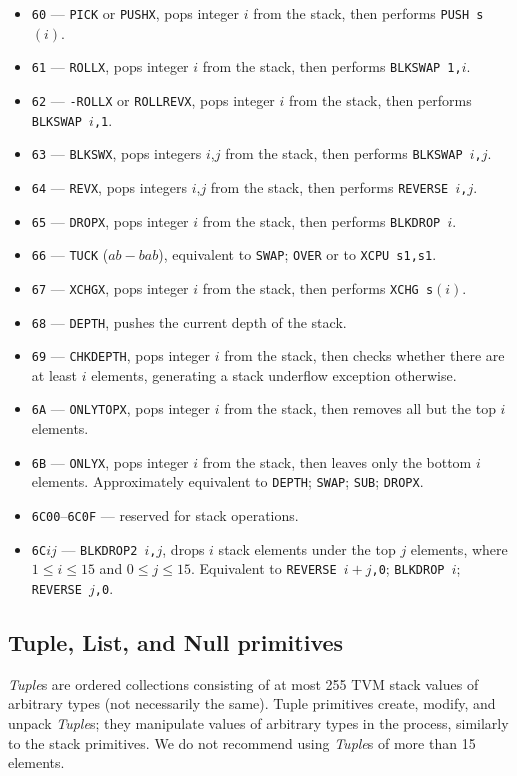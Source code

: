 \documentclass[12pt,oneside]{article}
\def\mysubsection#1{

    \subsection{#1}\fancyhead[C]{\small{\textsc{\textrm{\thesubsection.} #1}}}}
\begin{document}
\begin{itemize}
\item {\tt 60} --- {\tt PICK} or {\tt PUSHX}, pops integer $i$ from the stack, then performs {\tt PUSH s$(i)$}.
\item {\tt 61} --- {\tt ROLLX}, pops integer $i$ from the stack, then performs {\tt BLKSWAP 1,$i$}.
\item {\tt 62} --- {\tt -ROLLX} or {\tt ROLLREVX}, pops integer $i$ from the stack, then performs {\tt BLKSWAP $i$,1}.
\item {\tt 63} --- {\tt BLKSWX}, pops integers $i$,$j$ from the stack, then performs {\tt BLKSWAP $i$,$j$}.
\item {\tt 64} --- {\tt REVX}, pops integers $i$,$j$ from the stack, then performs {\tt REVERSE $i$,$j$}.
\item {\tt 65} --- {\tt DROPX}, pops integer $i$ from the stack, then performs {\tt BLKDROP $i$}.
\item {\tt 66} --- {\tt TUCK} ($a b - b a b$), equivalent to {\tt SWAP}; {\tt OVER} or to {\tt XCPU s1,s1}.
\item {\tt 67} --- {\tt XCHGX}, pops integer $i$ from the stack, then performs {\tt XCHG s$(i)$}.
\item {\tt 68} --- {\tt DEPTH}, pushes the current depth of the stack.
\item {\tt 69} --- {\tt CHKDEPTH}, pops integer $i$ from the stack, then checks whether there are at least $i$ elements, generating a stack underflow exception otherwise.
\item {\tt 6A} --- {\tt ONLYTOPX}, pops integer $i$ from the stack, then removes all but the top $i$ elements.
\item {\tt 6B} --- {\tt ONLYX}, pops integer $i$ from the stack, then leaves only the bottom $i$ elements. Approximately equivalent to {\tt DEPTH}; {\tt SWAP}; {\tt SUB}; {\tt DROPX}.
\item {\tt 6C00}--{\tt 6C0F} --- reserved for stack operations.
\item {\tt 6C$ij$} --- {\tt BLKDROP2 $i$,$j$}, drops $i$ stack elements under the top $j$ elements, where $1\leq i\leq15$ and $0\leq j\leq 15$. Equivalent to {\tt REVERSE $i+j$,0}; {\tt BLKDROP $i$}; {\tt REVERSE $j$,0}.
\end{itemize}

\mysubsection{Tuple, List, and Null primitives}

{\em Tuple\/}s are ordered collections consisting of at most 255 TVM stack values of arbitrary types (not necessarily the same). Tuple primitives create, modify, and unpack {\em Tuple\/}s; they manipulate values of arbitrary types in the process, similarly to the stack primitives. We do not recommend using {\em Tuple\/}s of more than 15 elements.
\end{document}
